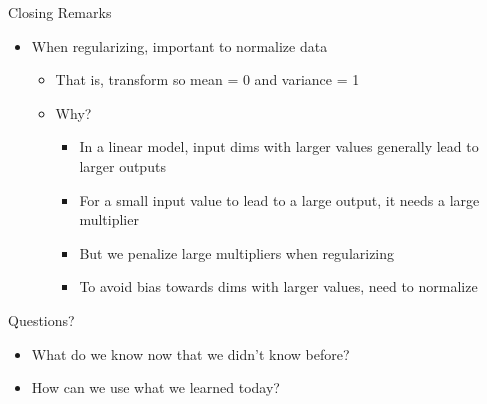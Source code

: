 \documentclass[aspectratio=169]{beamer}
\begin{document}
\begin{frame}{Closing Remarks}

\begin{itemize}
\item When regularizing, important to normalize data
	\begin{itemize}
	\item That is, transform so mean = 0 and variance = 1
	\item Why?
		\begin{itemize}
	\item In a linear model, input dims with larger values generally lead to larger outputs
	\item For a small input value to lead to a large output, it needs a large multiplier
	\item But we penalize large multipliers when regularizing
	\item To avoid bias towards dims with larger values, need to normalize
		\end{itemize}
	\end{itemize}
\end{itemize}
\end{frame}
\begin{frame}{Questions?}
\begin{itemize}
	\item What do we know now that we didn't know before?
	\vspace{5 em}
	\item How can we use what we learned today?
\end{itemize}
\end{frame}


\end{document}
